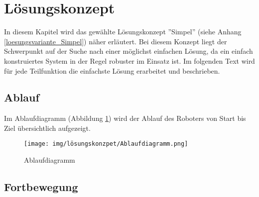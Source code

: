 \documentclass[../main.tex]{subfiles}
\begin{document}
\newpage
\section{Lösungskonzept}

In diesem Kapitel wird das gewählte Lösungskonzept ''Simpel'' (siehe Anhang \ref{loesungsvariante_Simpel}) näher erläutert. Bei diesem Konzept liegt der Schwerpunkt auf der Suche nach einer möglichst einfachen Lösung, da ein einfach konstruiertes System in der Regel robuster im Einsatz ist. Im folgenden Text wird für jede Teilfunktion die einfachste Lösung erarbeitet und beschrieben.

\subsection{Ablauf}

Im Ablaufdiagramm (Abbildung \ref{img:ablaufdiagramm}) wird der Ablauf des Roboters von Start bis Ziel übersichtlich aufgezeigt.

\begin{figure}[H]
\texttt{[image: img/lösungskonzpet/Ablaufdiagramm.png]}
\caption{Ablaufdiagramm}
\label{img:ablaufdiagramm}
\end{figure}

\subsection{Fortbewegung}
\end{document}

